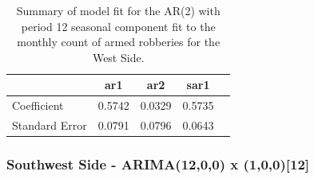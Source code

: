 \documentclass{article} %
\begin{document}
 \begin{table}[h]
	\label{tab:data}
	\begin{center}
	\begin{tabular}{lcccc}
			\hline
			&           ar1  &   ar2  &  sar1    \\\hline
Coefficient   &   0.5742 & 0.0329&  0.5735  \\
Standard Error & 0.0791&  0.0796 & 0.0643    \\ 
		\end{tabular}
	\caption{Summary of model fit for the AR(2) with period 12 seasonal component fit to the monthly count of armed robberies for the West Side.}
	\end{center}
\end{table}



 \break
 \newpage
\subsubsection{Southwest Side - ARIMA(12,0,0) x (1,0,0)[12]}
 
\end{document}
